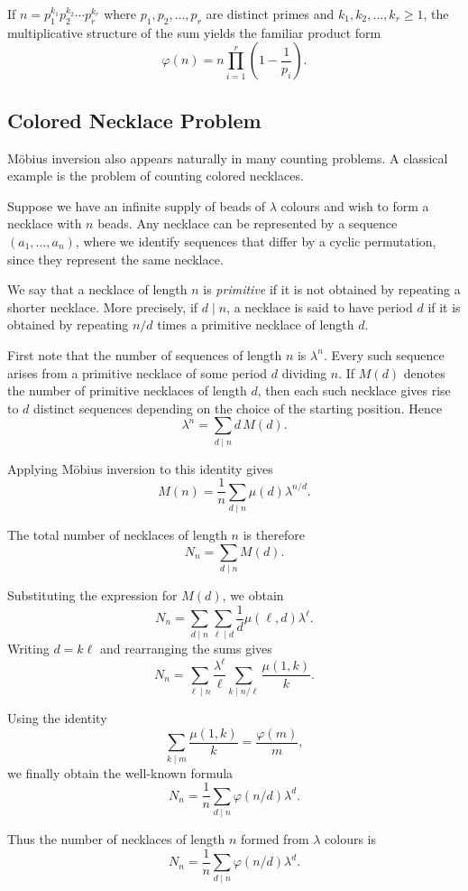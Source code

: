 \documentclass{amsart}
\numberwithin{equation}{section}
\theoremstyle{plain}
\theoremstyle{definition}
\begin{document}
If $n=p_1^{k_1}p_2^{k_2}\cdots p_r^{k_r}$ where
$p_1,p_2,\ldots,p_r$ are distinct primes and $k_1,k_2,\ldots,k_r\ge1$,
the multiplicative structure of the sum yields the familiar product form
\[
\varphi(n)=n\prod_{i=1}^{r}\left(1-\frac{1}{p_i}\right).
\]


\subsection{Colored Necklace Problem}

M\"obius inversion also appears naturally in many counting problems.
A classical example is the problem of counting colored necklaces.

Suppose we have an infinite supply of beads of $\lambda$ colours and
wish to form a necklace with $n$ beads. Any necklace can be represented
by a sequence $(a_1,\ldots,a_n)$, where we identify sequences that differ
by a cyclic permutation, since they represent the same necklace.

We say that a necklace of length $n$ is \emph{primitive} if it is not
obtained by repeating a shorter necklace. More precisely, if $d\mid n$,
a necklace is said to have period $d$ if it is obtained by repeating
$n/d$ times a primitive necklace of length $d$.

First note that the number of sequences of length $n$ is $\lambda^n$.
Every such sequence arises from a primitive necklace of some period
$d$ dividing $n$. If $M(d)$ denotes the number of primitive necklaces
of length $d$, then each such necklace gives rise to $d$ distinct
sequences depending on the choice of the starting position. Hence
\[
\lambda^n=\sum_{d\mid n} d\,M(d).
\]

Applying M\"obius inversion to this identity gives
\[
M(n)=\frac{1}{n}\sum_{d\mid n}\mu(d)\lambda^{n/d}.
\]

The total number of necklaces of length $n$ is therefore
\[
N_n=\sum_{d\mid n} M(d).
\]

Substituting the expression for $M(d)$, we obtain
\[
N_n=\sum_{d\mid n}\sum_{\ell\mid d}\frac{1}{d}\mu(\ell,d)\lambda^{\ell}.
\]
Writing $d=k\ell$ and rearranging the sums gives
\[
N_n=\sum_{\ell\mid n}\frac{\lambda^{\ell}}{\ell}
\sum_{k\mid n/\ell}\frac{\mu(1,k)}{k}.
\]

Using the identity
\[
\sum_{k\mid m}\frac{\mu(1,k)}{k}=\frac{\varphi(m)}{m},
\]
we finally obtain the well-known formula
\[
N_n=\frac{1}{n}\sum_{d\mid n}\varphi(n/d)\lambda^{d}.
\]

Thus the number of necklaces of length $n$ formed from $\lambda$
colours is
\[
N_n=\frac{1}{n}\sum_{d\mid n}\varphi(n/d)\lambda^{d}.
\]
\end{document}
